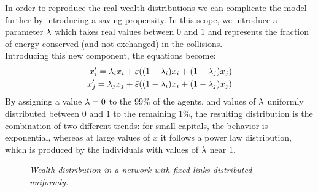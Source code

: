 In order to reproduce the real wealth distributions we can complicate the model further by introducing a saving propensity.
In this scope, we introduce a parameter $\lambda$ which takes real values between $0$ and $1$ and represents the fraction of energy conserved (and not exchanged) in the collisions. \\
Introducing this new component, the equations become:
\begin{equation}
	\begin{split}
		x'_i = \lambda_ix_i + \varepsilon((1-\lambda_i)x_i + (1-\lambda_j)x_j) 	\\
		x'_j = \lambda_jx_j + \bar{\varepsilon}((1-\lambda_i)x_i + (1-\lambda_j)x_j) 	\\
	\end{split}
\end{equation}
By assigning a value $\lambda = 0$ to the $99 \%$ of the agents, and values of $\lambda$ uniformly distributed between $0$ and $1$ to the remaining $1\%$, the resulting distribution is the combination of two different trends: for small capitals, the behavior is exponential, whereas at large values of $x$ it follows a power law distribution, which is produced by the individuals with values of $\lambda$ near $1$.
\begin{figure}[ht!]
    \centering
    \scalebox{.7}{}
    \caption{\emph{Wealth distribution in a network with fixed links distributed uniformly.}}
    \label{fig:savings}
\end{figure}
